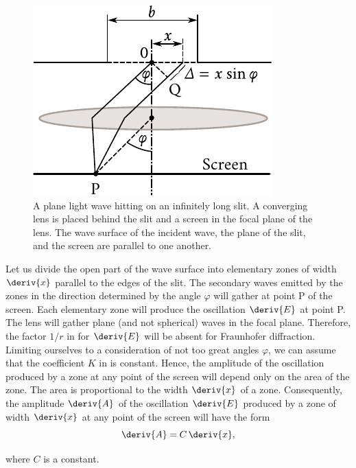 \begin{figure}[!htb]
	\begin{center}
		\includegraphics[scale=1]{figures/ch_18/fig_18_26.pdf}
        \caption[]{A plane light wave hitting on an infinitely long slit. A converging lens is placed behind the slit and a screen in the focal plane of the lens. The wave surface of the incident wave, the plane of the slit, and the screen are parallel to one another.}
		\label{fig:18_26}
	\end{center}
	\vspace{-0.8cm}
\end{figure}

Let us divide the open part of the wave surface into elementary zones of width $\deriv{x}$ parallel to the edges of the slit.
The secondary waves emitted by the zones in the
direction determined by the angle $\varphi$ will gather at point P of the screen.
Each elementary zone will produce the oscillation $\deriv{E}$ at point P.
The lens will gather plane (and not spherical) waves in the focal plane.
Therefore, the factor $1/r$ in  for $\deriv{E}$ will be absent for Fraunhofer diffraction.
Limiting ourselves to a consideration of not too great angles $\varphi$, we can assume that the coefficient $K$ in  is constant.
Hence, the amplitude of the oscillation produced by a zone at any point of the screen will depend only on the area of the zone.
The area is proportional to the width $\deriv{x}$ of a zone.
Consequently, the amplitude $\deriv{A}$ of the oscillation $\deriv{E}$ produced by a zone of width $\deriv{x}$ at any point of the screen will have the form
\begin{equation*}
	\deriv{A} = C\, \deriv{x},
\end{equation*}

\noindent
where $C$ is a constant.

